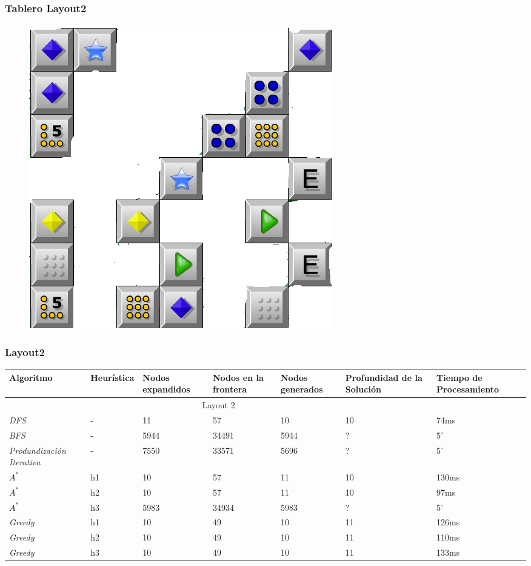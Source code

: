 \documentclass{beamer}
\begin{document}
\begin{frame}
\frametitle{Tablero Layout2}
\begin{figure}[hb]
	\includegraphics[scale=0.3]{../Boards/Layout3.png}
	 \label{fig:layout3}
\end{figure}
\end{frame}

\begin{frame}
\frametitle{Layout2}

\tiny{
\begin{table}[h]
\begin{center}
	\begin{tabular}{|p{1.3cm}|p{1.0cm}|p{1cm}|p{1cm}|p{1cm}|p{1cm}|p{2cm}|}
	\hline
	 Algoritmo & Heur\'istica & Nodos expandidos & Nodos en la frontera & Nodos generados & Profundidad de la Soluci\'on & Tiempo de Procesamiento\\
	\hline \hline
		 \multicolumn{6}{|c|}{Layout 2} \\
	\hline
	\textit{DFS} & - &  11 & 57 & 10 & 10 & 74ms \\
	\textit{BFS} & - & 5944 & 34491 & 5944 & ? & 5' \\
	\textit{Produndizaci\'on Iterativa} &  - & 7550 & 33571 & 5696 & ? & 5' \\	
	\textit{$A^*$} & h1 & 10 & 57 & 11 & 10 & 130ms \\
	\textit{$A^*$} & h2 & 10 & 57 & 11 & 10 & 97ms \\
	\textit{$A^*$} & h3 & 5983 & 34934 & 5983 & ? & 5'\\
	\textit{Greedy} & h1 & 10 & 49 & 10 & 11 & 126ms\\
	\textit{Greedy} & h2 & 10 & 49 & 10 & 11 & 110ms\\
	\textit{Greedy} & h3 & 10 & 49 & 10 & 11 & 133ms\\
	\hline
	\end{tabular}
\end{center}
\label{tab:costLayout3}
\end{table}}

\end{frame}
\end{document}
